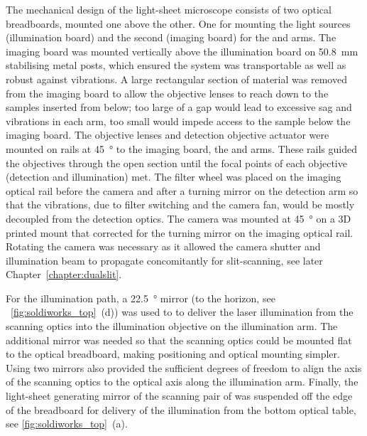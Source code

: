 The mechanical design of the \gls{light-sheet} microscope consists of two optical breadboards, mounted one above the other.
One for mounting the light sources (\gls{illumination board}) and the second (\gls{imaging board}) for the  and  arms.
The \gls{imaging board} was mounted vertically above the \gls{illumination board} on \SI{50.8}{\milli\metre} stabilising metal posts, which ensured the system was transportable as well as robust against vibrations.
A large rectangular section of material was removed from the \gls{imaging board} to allow the objective lenses to reach down to the samples inserted from below; too large of a gap would lead to excessive sag and vibrations in each arm, too small would impede access to the sample below the imaging board.
The objective lenses and detection objective actuator were mounted on rails at \SI{45}{\degree} to the \gls{imaging board}, the  and  arms.
These rails guided the objectives through the open section until the focal points of each objective (detection and illumination) met.
The filter wheel was placed on the \gls{imaging optical rail} before the camera and after a turning mirror on the \gls{detection arm}
so that the vibrations, due to
filter switching and the camera fan, would be mostly decoupled from the detection optics.
The camera was mounted at \SI{45}{\degree} on a \gls{3D} printed mount that corrected for the turning mirror on the \gls{imaging optical rail}.
Rotating the camera was necessary as it allowed the camera shutter and illumination beam to propagate concomitantly for slit-scanning, see later Chapter~\ref{chapter:dualslit}.

For the illumination path, a \SI{22.5}{\degree} mirror
(to the horizon, see \figurename~\ref{fig:soldiworks_top}~(d))
was used to to deliver the laser illumination from the scanning optics into the illumination objective on the \gls{illumination arm}.
The additional mirror was needed so that the scanning optics could be mounted flat to the optical breadboard, making positioning and optical mounting simpler.
Using two mirrors also provided the sufficient degrees of freedom to align the axis of the scanning optics to the optical axis along the \gls{illumination arm}.
Finally, the light-sheet generating mirror of the scanning pair of was suspended off the edge of the breadboard for delivery of the  illumination from the bottom optical table, see \figurename\ref{fig:soldiworks_top}~(a).


